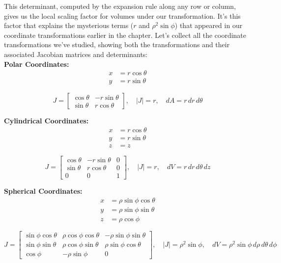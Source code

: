 \noindent This determinant, computed by the expansion rule along any row or column, gives us the local scaling factor for volumes under our transformation. It's this factor that explains the mysterious terms ($r$ and $\rho^2\sin\phi$) that appeared in our coordinate transformations earlier in the chapter. Let's collect all the coordinate transformations we've studied, showing both the transformations and their associated Jacobian matrices and determinants: \\

\noindent \textbf{Polar Coordinates:}
\begin{align*}
x &= r\cos\theta \\
y &= r\sin\theta 
\end{align*}

\[
J = \begin{bmatrix}
\cos\theta & -r\sin\theta \\
\sin\theta & r\cos\theta
\end{bmatrix}, \quad |J| = r, \quad dA = r\,dr\,d\theta
\]

\noindent \textbf{Cylindrical Coordinates:}
\begin{align*}
x &= r\cos\theta \\
y &= r\sin\theta \\
z &= z
\end{align*}

\[
J = \begin{bmatrix}
\cos\theta & -r\sin\theta & 0 \\
\sin\theta & r\cos\theta & 0 \\
0 & 0 & 1
\end{bmatrix}, \quad |J| = r, \quad dV = r\,dr\,d\theta\,dz
\]

\noindent \textbf{Spherical Coordinates:}
\begin{align*}
x &= \rho\sin\phi\cos\theta \\
y &= \rho\sin\phi\sin\theta \\
z &= \rho\cos\phi
\end{align*}

\[
J = \begin{bmatrix}
\sin\phi\cos\theta & \rho\cos\phi\cos\theta & -\rho\sin\phi\sin\theta \\
\sin\phi\sin\theta & \rho\cos\phi\sin\theta & \rho\sin\phi\cos\theta \\
\cos\phi & -\rho\sin\phi & 0
\end{bmatrix}, \quad |J| = \rho^2\sin\phi, \quad dV = \rho^2\sin\phi\,d\rho\,d\theta\,d\phi
\]


